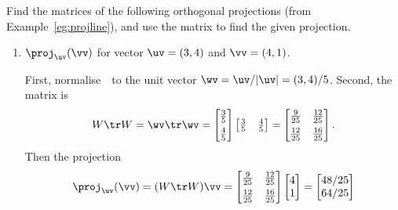 \begin{example} \label{eg:projlinem}
Find the matrices of the following orthogonal projections (from Example~\ref{eg:projline}), and use the matrix to find the given projection.
\begin{enumerate}
\item \(\proj_\uv(\vv)\) for vector \(\uv=(3,4)\) and \(\vv=(4,1)\).
\begin{solution} 
First, normalise~\uv\ to the unit vector \(\wv=\uv/|\uv|=(3,4)/5\). Second, the matrix is
\begin{equation*}
W\tr W=\wv\tr\wv=\begin{bmatrix} \frac35\\[1ex] \frac45 \end{bmatrix}\begin{bmatrix} \frac35&\frac45 \end{bmatrix}
=\begin{bmatrix} \frac9{25}&\frac{12}{25}\\[1ex]
\frac{12}{25}&\frac{16}{25} \end{bmatrix}.
\end{equation*}
Then the projection
\begin{equation*}
\proj_\uv(\vv) =(W\tr W)\vv
=\begin{bmatrix} \frac9{25}&\frac{12}{25}\\[1ex]
\frac{12}{25}&\frac{16}{25} \end{bmatrix}\begin{bmatrix} 4\\1 \end{bmatrix}
=\begin{bmatrix} 48/25\\64/25 \end{bmatrix}
\end{equation*}
\end{solution}


\end{enumerate}
\end{example}
